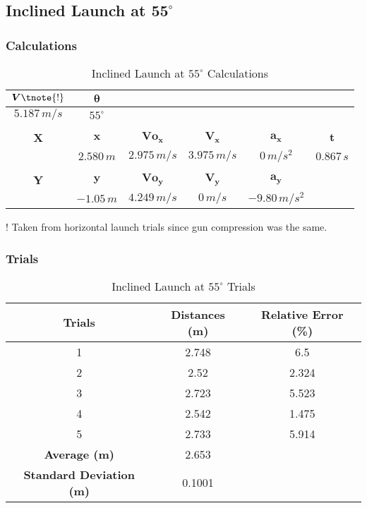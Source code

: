 
\subsection{Inclined Launch at $\boldsymbol{55^\circ}$}

\subsubsection{Calculations}

\begin{table}[H]
\centering
\begin{threeparttable}
\begin{tabular}{cccccc}
$\boldsymbol{V}\tnote{!}$ & $\boldsymbol{\theta}$ &  &  &  &  \\ \hline
$5.187\,m/s$ & $55^\circ$ &  &  &  &  \\
 &  &  &  &  &  \\
\textbf{X} & $\boldsymbol{x}$ & $\boldsymbol{V\!o_x}$ & $\boldsymbol{V_x}$ & $\boldsymbol{a_x}$ & $\boldsymbol{t}$ \\ \hline
 & $2.580\,m$ & $2.975\,m/s$ & $3.975\,m/s$ & $0\,m/s^2$ & $0.867\,s$ \\
 &  &  &  &  &  \\
\textbf{Y} & $\boldsymbol{y}$ & $\boldsymbol{V\!o_y}$ & $\boldsymbol{V_y}$ & $\boldsymbol{a_y}$ &  \\ \hline
 & $-1.05\,m$ & $4.249\,m/s$ & $0\,m/s$ & $-9.80\,m/s^2$ & 
\end{tabular}
\begin{tablenotes}\footnotesize
	\item[!] Taken from horizontal launch trials since gun compression was the same. 
\end{tablenotes}	
\end{threeparttable}
\caption{Inclined Launch at $55^\circ$ Calculations}
\label{tab:IL55c}
\end{table}

\subsubsection{Trials}

\begin{table}[H]
\centering
\begin{tabular}{ccc}
\textbf{Trials} & \textbf{Distances (m)} & \textbf{Relative Error (\%)} \\ \hline
1 & 2.748 & 6.5 \\
2 & 2.52 & 2.324 \\
3 & 2.723 & 5.523 \\
4 & 2.542 & 1.475 \\
5 & 2.733 & 5.914 \\ \hline
\textbf{Average (m)} & 2.653 &  \\
\textbf{Standard Deviation (m)} & 0.1001 & 
\end{tabular}
\caption{Inclined Launch at $55^\circ$ Trials}
\label{tab:IL55t}
\end{table}
\newpage

